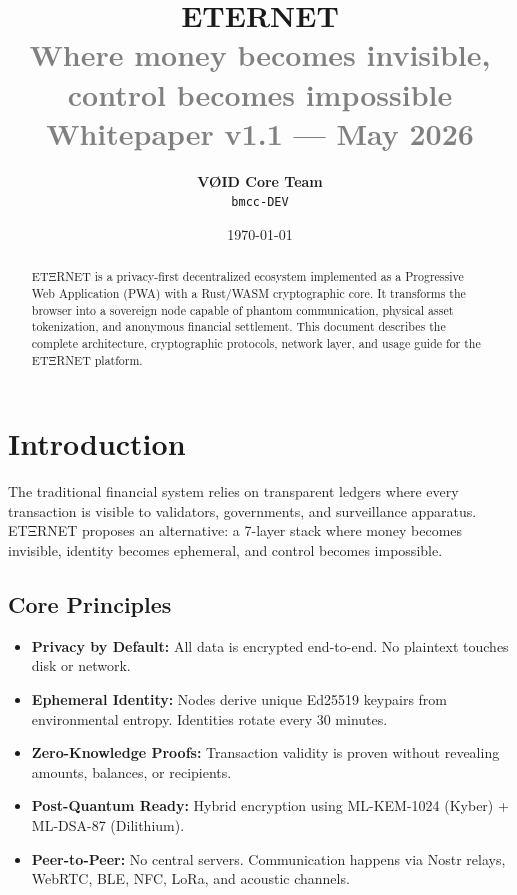 \documentclass[11pt,a4paper]{article}
\title{
  \vspace{-2cm}
  \textbf{\Huge ETERNET}\\[0.3cm]
  \textcolor{gray}{\large Where money becomes invisible, control becomes impossible}\\[0.5cm]
  \textcolor{gray}{\normalsize Whitepaper v1.1 --- May 2026}
}
\author{
  \textbf{V\O{}ID Core Team}\\
  \texttt{bmcc-DEV}
}
\date{\today}
\begin{document}
\maketitle
\thispagestyle{empty}

\begin{abstract}
\noindent
ETΞRNET is a privacy-first decentralized ecosystem implemented as a Progressive Web Application (PWA) with a Rust/WASM cryptographic core. It transforms the browser into a sovereign node capable of phantom communication, physical asset tokenization, and anonymous financial settlement. This document describes the complete architecture, cryptographic protocols, network layer, and usage guide for the ETΞRNET platform.
\end{abstract}

\tableofcontents
\newpage

\section{Introduction}

The traditional financial system relies on transparent ledgers where every transaction is visible to validators, governments, and surveillance apparatus. ETΞRNET proposes an alternative: a 7-layer stack where money becomes invisible, identity becomes ephemeral, and control becomes impossible.

\subsection{Core Principles}
\begin{itemize}[nosep]
  \item \textbf{Privacy by Default:} All data is encrypted end-to-end. No plaintext touches disk or network.
  \item \textbf{Ephemeral Identity:} Nodes derive unique Ed25519 keypairs from environmental entropy. Identities rotate every 30 minutes.
  \item \textbf{Zero-Knowledge Proofs:} Transaction validity is proven without revealing amounts, balances, or recipients.
  \item \textbf{Post-Quantum Ready:} Hybrid encryption using ML-KEM-1024 (Kyber) + ML-DSA-87 (Dilithium).
  \item \textbf{Peer-to-Peer:} No central servers. Communication happens via Nostr relays, WebRTC, BLE, NFC, LoRa, and acoustic channels.
\end{itemize}
\end{document}

